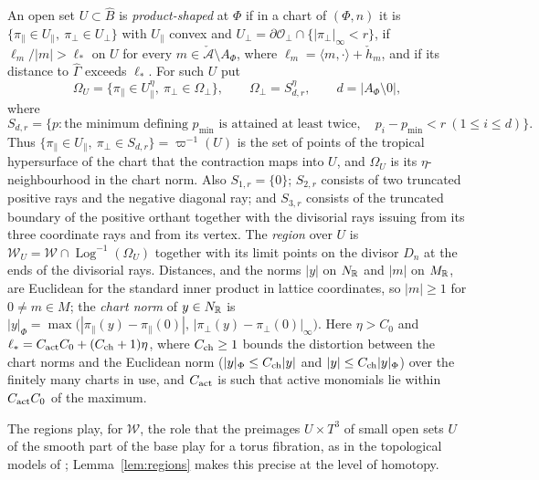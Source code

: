 \begin{definition}\label{def:regions}
An open set $U\subset\widehat B$ is \emph{product-shaped} at $\Phi$ if in a chart of $(\Phi,n)$ it is
$\{\pi_\parallel\in U_\parallel,\ \pi_\perp\in U_\perp\}$ with $U_\parallel$ convex and
$U_\perp=\partial\mathcal O_\perp\cap\{|\pi_\perp|_\infty<r\}$, if $\ell_m/|m|>\ell_*$ on $U$ for every
$m\in\check{\mathcal A}\setminus A_\Phi$, where $\ell_m=\langle m,\cdot\rangle+\check h_m$, and if its distance to
$\widehat\Gamma$ exceeds $\ell_*$. For such $U$ put
\[
\Omega_U=\{\pi_\parallel\in U_\parallel^\eta,\ \pi_\perp\in\Omega_\perp\},\qquad
\Omega_\perp=S_{d,r}^{\eta},\qquad d=|A_\Phi\setminus0|,
\]
where
\[
 S_{d,r}=\{p:\text{the minimum defining }p_{\min}\text{ is attained at least twice},\quad
                    p_i-p_{\min}<r\ (1\le i\le d)\}.
\]
Thus $\{\pi_\parallel\in U_\parallel,\ \pi_\perp\in S_{d,r}\}=\varpi^{-1}(U)$ is the set of points of the tropical hypersurface of
the chart that the contraction maps into $U$, and $\Omega_U$ is its $\eta$-neighbourhood in the chart norm.
Also $S_{1,r}=\{0\}$; $S_{2,r}$ consists of two truncated positive rays and the negative diagonal ray;
and $S_{3,r}$ consists of the truncated boundary of the positive orthant together with the divisorial rays issuing from
its three coordinate rays and from its vertex.
The \emph{region} over
$U$ is $\mathscr W_U=\mathscr W\cap\operatorname{Log}^{-1}(\Omega_U)$ together with its limit points on the divisor $D_n$ at the ends of the
divisorial rays. Distances, and the norms $|y|$ on $N_\mathbb R$ and $|m|$ on $M_\mathbb R$, are Euclidean for the standard inner product in
lattice coordinates, so $|m|\ge1$ for $0\neq m\in M$; the \emph{chart norm} of $y\in N_\mathbb R$ is
$|y|_\Phi=\max\bigl(|\pi_\parallel(y)-\pi_\parallel(0)|,\,|\pi_\perp(y)-\pi_\perp(0)|_\infty\bigr)$. Here $\eta>C_0$ and
$\ell_*=C_{\rm act}C_0+(C_{\rm ch}+1)\eta$, where $C_{\rm ch}\ge1$ bounds the distortion between the chart norms and the
Euclidean norm ($|y|_\Phi\le C_{\rm ch}|y|$ and $|y|\le C_{\rm ch}|y|_\Phi$) over the finitely many charts in use, and
$C_{\rm act}$ is such that active monomials lie within $C_{\rm act}C_0$ of the maximum.
\end{definition}

The regions play, for $\mathscr W$, the role that the preimages $U\times T^3$ of small open sets $U$ of the smooth part of the base
play for a torus fibration, as in the topological models of \cite{CBM}; Lemma~\ref{lem:regions} makes this precise at the
level of homotopy.

